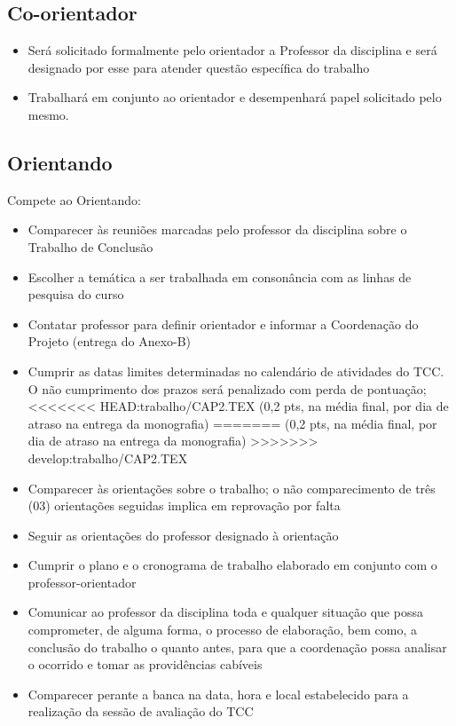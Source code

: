\subsection{Co-orientador}

	\begin{itemize}	
		\item Será solicitado formalmente pelo orientador a Professor da disciplina e será designado por esse para atender questão específica do trabalho
		
		\item Trabalhará em conjunto ao orientador e desempenhará papel solicitado pelo mesmo.
	\end{itemize}


\subsection{Orientando}

Compete ao Orientando:

	\begin{itemize}
		\item Comparecer às reuniões marcadas pelo professor da disciplina sobre o Trabalho de Conclusão
		
		\item Escolher a temática a ser trabalhada em consonância com as linhas de pesquisa do curso
		
		\item Contatar professor para definir orientador e informar a Coordenação do Projeto (entrega do Anexo-B)
		
		\item Cumprir as datas limites determinadas no calendário de atividades do TCC. O não cumprimento dos prazos será penalizado com perda de pontuação; 
<<<<<<< HEAD:trabalho/CAP2.TEX
		(0,2 pts, na média final, por dia de atraso na entrega da monografia)
=======
		(0,2 pts, na m\'edia final, por dia de atraso na entrega da monografia)
>>>>>>> develop:trabalho/CAP2.TEX
		
		\item Comparecer às orientações sobre o trabalho; o não comparecimento de três (03) orientações seguidas implica em reprovação por falta
		
		\item Seguir as orientações do professor designado à orientação
		
		\item Cumprir o plano e o cronograma de trabalho elaborado em conjunto com o professor-orientador
		
		\item Comunicar ao professor da disciplina toda e qualquer situação que possa comprometer, de alguma forma, o processo de elaboração, bem como, a conclusão do 			trabalho o quanto antes, para que a coordenação possa analisar o ocorrido e tomar as providências cabíveis
		
		\item Comparecer perante a banca na data, hora e local estabelecido para a realização da sessão de avaliação do TCC
	\end{itemize}


